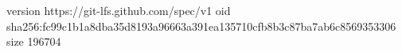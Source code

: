 version https://git-lfs.github.com/spec/v1
oid sha256:fc99c1b1a8dba35d8193a96663a391ea135710cfb8b3c87ba7ab6c8569353306
size 196704
